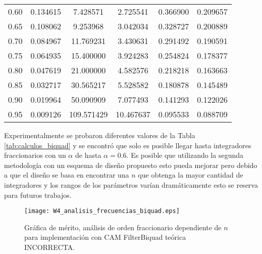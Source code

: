 \begin{table}[!hbp]
\begin{tabular}{cccccc}
			0.60 & 0.134615 & 7.428571 & 2.725541 & 0.366900 & 0.209657 \\   
		                                                         
			0.65 & 0.108062 & 9.253968 & 3.042034 & 0.328727 & 0.200889 \\   
		                                                          
			0.70 & 0.084967 & 11.769231 & 3.430631 & 0.291492 & 0.190591 \\  
		                                                         
			0.75 & 0.064935 & 15.400000 & 3.924283 & 0.254824 & 0.178377 \\  
			                                                          
			0.80 & 0.047619 & 21.000000 & 4.582576 & 0.218218 & 0.163663 \\  
		                                                         
			0.85 & 0.032717 & 30.565217 & 5.528582 & 0.180878 & 0.145489 \\  
			                                                         
			0.90 & 0.019964 & 50.090909 & 7.077493 & 0.141293 & 0.122026 \\  
			                                                           
			0.95 & 0.009126 & 109.571429 & 10.467637 & 0.095533 & 0.088709 \\
			\hline                                              
			\end{tabular}                                                                
	\end{table}
	
	Experimentalmente se probaron diferentes valores de la Tabla \ref{tab:calculos_biquad} y se encontró que solo es posible llegar hasta integradores fraccionarios con un $\alpha$ de hasta $\alpha = 0.6$. Es posible que utilizando la segunda metodología con un esquema de diseño propuesto esto pueda mejorar pero debido a que el diseño se basa en encontrar una $n$ que obtenga la mayor cantidad de integradores y los rangos de los parámetros varían dramáticamente esto se reserva para futuros trabajos.  
	
	\begin{figure}[hbtp]
		\caption{Gráfica de mérito, análisis de orden fraccionario dependiente de $n$ para implementación con CAM FilterBiquad teórica INCORRECTA.} 
		\label{fig:W4_analisis_frecuencias_biquad}
		\centering
		\texttt{[image: W4\_analisis\_frecuencias\_biquad.eps]}
	\end{figure}	
	
